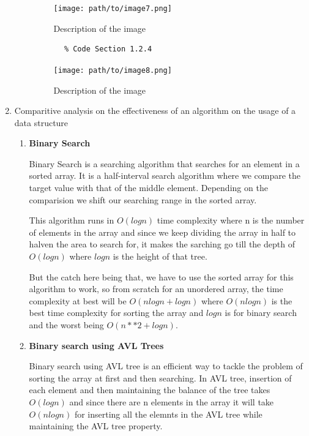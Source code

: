 \documentclass{article}
\begin{document}
\begin{enumerate}
\begin{enumerate}[label*=\arabic*.]
        \begin{figure}[h]
            \centering
            \texttt{[image: path/to/image7.png]}
            \caption{Description of the image}
            \label{fig:image7}
        \end{figure}

        \begin{verbatim}
        % Code Section 1.2.4
        \end{verbatim}

        \begin{figure}[h]
            \centering
            \texttt{[image: path/to/image8.png]}
            \caption{Description of the image}
            \label{fig:image8}
        \end{figure}
\end{enumerate}

  \item Comparitive analysis on the effectiveness of an algorithm on the usage of a data structure
    \begin{enumerate}[label*=\arabic*.]
      \item \textbf{Binary Search} 

        Binary Search is a searching algorithm that searches for an element in a sorted array. It is a half-interval search algorithm where we compare the target value with that of the middle element. Depending on the comparision we shift our searching range in the sorted array.  

        This algorithm runs in \( O(logn) \) time complexity where n is the number of elements in the array and since we keep dividing the array in half to halven the area to search for, it makes the sarching go till the depth of \( O(logn) \) where \( logn \) is the height of that tree. 

        But the catch here being that, we have to use the sorted array for this algorithm to work, so from scratch for an unordered array, the time complexity at best will be \( O( nlogn + logn ) \) where \( O(nlogn) \) is the best time complexity for sorting the array and \( logn \) is for binary search and the worst being \( O(n**2 + logn) \).


      \item \textbf{Binary search using AVL Trees}

        Binary search using AVL tree is an efficient way to tackle the problem of sorting the array at first and then searching. In AVL tree, insertion of each element and then maintaining the balance of the tree takes \( O(logn) \) and since there are n elements in the array it will take \( O(nlogn) \) for inserting all the elemnts in the AVL tree while maintaining the AVL tree property. 


\end{enumerate}
\end{enumerate}
\end{document}
